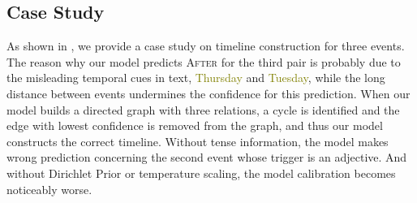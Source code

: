 \documentclass[11pt]{article}
\begin{document}
\subsection{Case Study}
\label{sec:case}
As shown in , we provide a case study on timeline construction for three events. The reason why our model predicts \textsc{After} for the third pair is probably due to the misleading temporal cues in text, \textcolor{olive}{Thursday} and \textcolor{olive}{Tuesday}, while the long distance between events undermines the confidence for this prediction.
When our model builds a directed graph with three relations, a cycle is identified and the edge with lowest confidence is removed from the graph, and thus our model constructs the correct timeline.
Without tense information, the model makes wrong prediction concerning the second event whose trigger is an adjective.
And without Dirichlet Prior or temperature scaling, the model calibration becomes noticeably worse.
\end{document}
